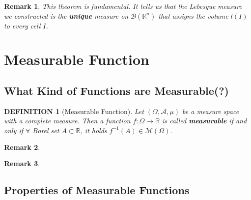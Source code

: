 \documentclass[12pt]{article}
\theoremstyle{blueplain}
\theoremstyle{bluedef}
\newtheorem{definition}{DEFINITION}[section]
\theoremstyle{blueremark}
\newtheorem{remark}{Remark}[section]
\newcommand{\R}{\mathbb{R}}
\numberwithin{equation}{section}
\begin{document}
\begin{remark}
  This theorem is fundamental. It tells us that the Lebesgue measure we constructed is the \textbf{unique} measure on $\mathcal{B}(\R^n)$ that assigns the volume $l(I)$ to every cell $I$.
\end{remark}

\clearpage

\section{Measurable Function}

\clearpage

\subsection{What Kind of Functions are Measurable(?)}

\begin{definition}[Measurable Function]

  Let $(\Omega, \mathcal{A}, \mu)$ be a measure space with a complete measure. Then a function $f: \Omega \rightarrow \R$ is called \textbf{measurable} if and only if $\forall$ Borel set $A \subset \R$, it holds $f^{-1}(A) \in \mathcal{M}(\Omega)$.
\end{definition}

\begin{remark}

\end{remark}

\begin{remark}

\end{remark}

\clearpage

\subsection{Properties of Measurable Functions}
\end{document}
